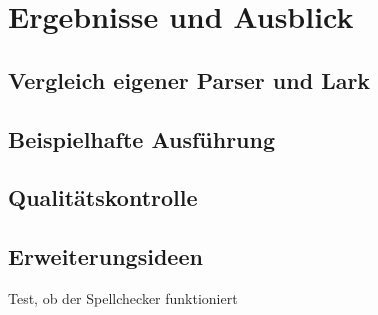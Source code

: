 \chapter{Ergebnisse und Ausblick}
\section{Vergleich eigener Parser und Lark}
\section{Beispielhafte Ausführung}
\section{Qualitätskontrolle}
\section{Erweiterungsideen}
Test, ob der Spellchecker funktioniert
\lipsum
